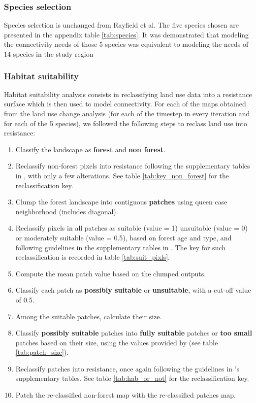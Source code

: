 \subsubsection{Species selection}

Species selection is unchanged from Rayfield et al. The five species chosen are presented in the appendix table \ref{tab:species}. It was demonstrated that modeling the connectivity needs of those 5 species was equivalent to modeling the needs of 14 species in the study region \citep{meurant_selecting_2018, albert_applying_2017}\\

\subsubsection{Habitat suitability}

Habitat suitability analysis consists in reclassifying land use data into a resistance surface which is then used to model connectivity. For each of the maps obtained from the land use change analysis (for each of the timestep in every iteration and for each of the 5 species), we followed the following steps to reclass land use into resistance:
\begin{enumerate}
\item Classify the landscape as \textbf{forest} and \textbf{non forest}.
\item Reclassify non-forest pixels into resistance following the supplementary tables in  \citeauthor{rayfield_priorisation_2018}, with only a few alterations. See table \ref{tab:key_non_forest} for the reclassification key.
\item Clump the forest landscape into contiguous \textbf{patches} using queen case neighborhood (includes diagonal).
\item Reclassify pixels in all patches as suitable (value = 1) unsuitable (value = 0) or moderately suitable (value = 0.5), based on forest age and type, and following guidelines in the supplementary tables in  \citeauthor{rayfield_priorisation_2018}.  The key for such reclassification is recorded in table \ref{tab:suit_pixls}.
\item  Compute the mean patch value based on the clumped outputs.
\item Classify each patch as \textbf{possibly suitable} or \textbf{unsuitable}, with a cut-off value of 0.5.
\item Among the suitable patches, calculate their size.
\item Classify \textbf{possibly suitable} patches into \textbf{fully suitable} patches or \textbf{too small} patches based on their size, using the values provided by \citeauthor{rayfield_priorisation_2018} (see table \ref{tab:patch_size}).
\item Reclassify patches into resistance, once again following the guidelines in \citeauthor{rayfield_priorisation_2018}'s supplementary tables. See table \ref{tab:hab_or_not} for the reclassification key.
\item Patch the re-classified non-forest map with the re-classified patches map. 
\end{enumerate}

